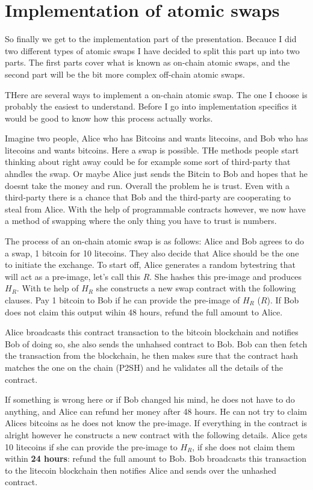 \chapter{Implementation of atomic swaps}
So finally we get to the implementation part of the presentation. Becauce I did
two different types of atomic swaps I have decided to split this part up into two parts.
The first parts cover what is known as on-chain atomic swaps, and the second part
will be the bit more complex off-chain atomic swaps.

THere are several ways to implement a on-chain atomic swap. The one I choose 
is probably the easiest to understand. Before I go into implementation specifics 
it would be good to know how this process actually works. 

Imagine two people, Alice who has Bitcoins and wants litecoins, and Bob who
has litecoins and wants bitcoins. Here a swap is possible. THe methods people
start thinking about right away could be for example some sort of third-party
that ahndles the swap. Or maybe Alice just sends the Bitcin to Bob and hopes
that he doesnt take the money and run. Overall the problem he is trust. 
Even with a third-party there is a chance that Bob and the third-party
are cooperating to steal from Alice. With the help of programmable contracts 
however, we now have a method of swapping where the only thing you have to 
trust is numbers.

The process of an on-chain atomic swap is as follows:
Alice and Bob agrees to do a swap, 1 bitcoin for 10 litecoins. They also 
decide that Alice should be the one to initiate the exchange. 
To start off, Alice generates a random bytestring that will act as a 
pre-image, let's call this $R$. She hashes this pre-image and produces $H_R$.  
With te help of $H_R$ she constructs a new swap contract with the following clauses. Pay 1
bitcoin to Bob if he can provide the pre-image of $H_R$ ($R$). If Bob does not claim 
this output wihin 48 hours, refund the full amount to Alice. 

Alice broadcasts this contract transaction to the bitcoin blockchain and
notifies Bob of doing so, she also sends the unhahsed contract to Bob. 
Bob can then fetch the transaction from the blockchain, he then makes
sure that the contract hash matches the one on the chain (P2SH) and
he validates all the details of the contract. 

If something is wrong here or if Bob changed his mind, he does not have 
to do anything, and Alice can refund her money after 48 hours. 
He can not try to claim Alices bitcoins as he does not know the
pre-image.
If everything in the contract is alright however he constructs a new contract with 
the following details. Alice gets 10 litecoins if she can provide
the pre-image to $H_R$, if she does not claim them within \textbf{24 hours}:
refund the full amount to Bob. Bob broadcasts this transaction to the litecoin
blockchain then notifies Alice and sends over the unhashed contract. 

